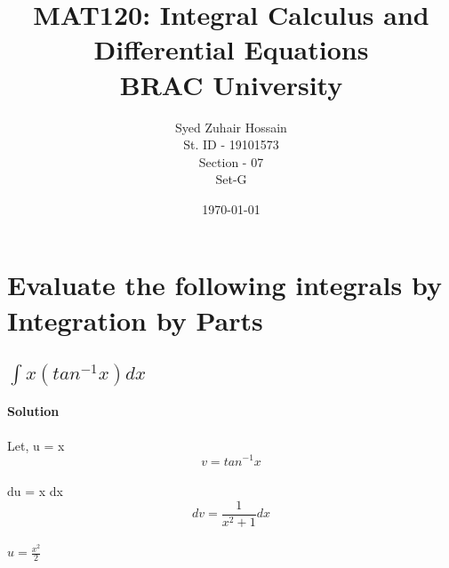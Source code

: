 \documentclass[12pt]{article}%
\begin{document}
\title{MAT120: Integral Calculus and
Differential Equations \\
BRAC University}

\author{Syed Zuhair Hossain \\ St. ID - 19101573 \\ Section - 07 \\ Set-G}
\date{\today}
\maketitle

\section{Evaluate the following integrals by Integration by Parts}
%
\subsection{$\int x (tan^{-1}x)dx$}
\textbf{Solution}\\\\

Let, u = x
 \[v = tan^{-1}x\] \\
 du = x dx      \[dv = \frac{1}{x^{2}+1} dx\] \\
$u = \frac{x^{2}}{2}$ \\\\
\end{document}
